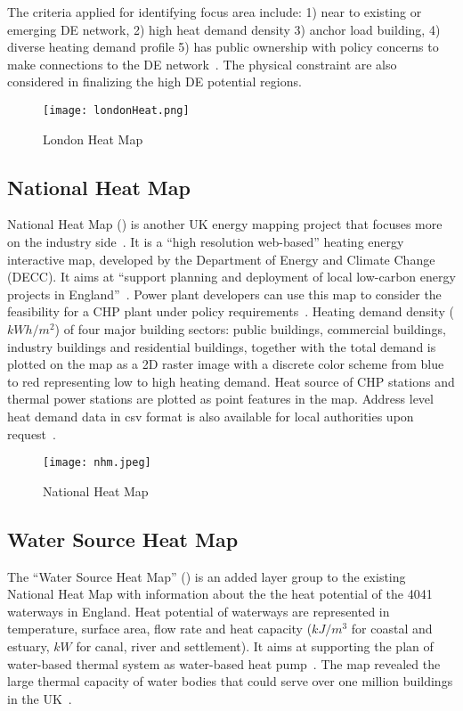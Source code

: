 The criteria applied for identifying focus area include: 1) near to
existing or emerging DE network, 2) high heat demand density 3) anchor
load building, 4) diverse heating demand profile 5) has public
ownership with policy concerns to make connections to the DE
network~\cite{decentralHeatMap2011}. The physical constraint are also
considered in finalizing the high DE potential regions.

\begin{figure}[h!]
  \centering
  \texttt{[image: londonHeat.png]}
  \caption[London Heat Map]{London Heat Map~\cite{londonHeatMapMap}}
  \label{fig:londonHeat}
\end{figure}

\subsection{National Heat Map}
National Heat Map () is another UK energy mapping
project that focuses more on the industry
side~\cite{decentralHeatMap2011}. It is a ``high resolution
web-based'' heating energy interactive map, developed by the
Department of Energy and Climate Change (DECC). It aims at ``support
planning and deployment of local low-carbon energy projects in
England''~\cite{heatMap2015}. Power plant developers can use this map
to consider the feasibility for a CHP plant under policy
requirements~\cite{decentralHeatMap2011}. Heating demand density
($kWh/m^2$) of four major building sectors: public buildings,
commercial buildings, industry buildings and residential buildings,
together with the total demand is plotted on the map as a 2D raster
image with a discrete color scheme from blue to red representing low
to high heating demand. Heat source of CHP stations and thermal power
stations are plotted as point features in the map. Address level heat
demand data in csv format is also available for local authorities upon
request~\cite{heatMapLocal2012}.

\begin{figure}[h!]
  \centering
  \texttt{[image: nhm.jpeg]}
  \caption[National Heat Map]{National Heat Map~\cite{heatMap2012}}
  \label{fig:nhm}
\end{figure}

\subsection{Water Source Heat Map}
The ``Water Source Heat Map'' () is an added layer
group to the existing National Heat Map with information about the the
heat potential of the 4041 waterways in England. Heat potential of
waterways are represented in temperature, surface area, flow rate and
heat capacity ($kJ/m^3$ for coastal and estuary, $kW$ for canal, river
and settlement). It aims at supporting the plan of water-based thermal
system as water-based heat pump~\cite{waterHeatMap}. The map revealed
the large thermal capacity of water bodies that could serve over one
million buildings in the UK~\cite{waterHeatMap}.

